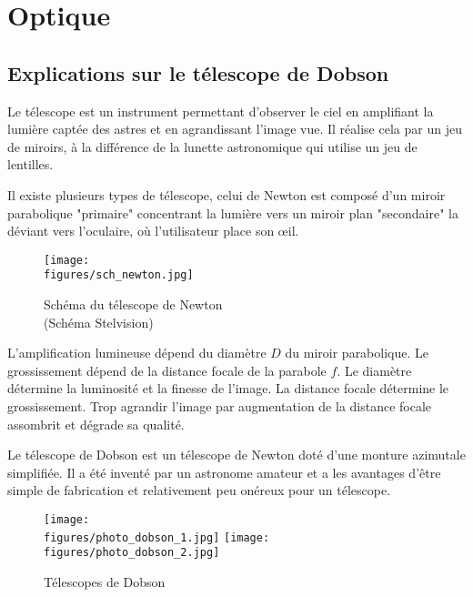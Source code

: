 \chapter{Optique}

\section{Explications sur le télescope de Dobson}

Le télescope est un instrument permettant d'observer le ciel en amplifiant la lumière captée des astres et en agrandissant l'image vue. Il réalise cela par un jeu de miroirs, à la différence de la lunette astronomique qui utilise un jeu de lentilles.

Il existe plusieurs types de télescope, celui de Newton est composé d'un miroir parabolique "primaire" concentrant la lumière vers un miroir plan "secondaire" la déviant vers l'oculaire, où l'utilisateur place son œil.

\begin{figure}[H]
    \centering
    \texttt{[image: \\figures/sch\_newton.jpg]}
    \decoRule
    \caption[
    Schéma du télescope de Newton\\(Schéma \textcopyright Stelvision)]{
    Schéma du télescope de Newton\\(Schéma \textcopyright Stelvision)}
    \label{fig:Schéma du télescope de Newton (Schéma copyright Stelvision)}
    \end{figure}

\vspace{1cm}

L'amplification lumineuse dépend du diamètre $D$ du miroir parabolique. Le grossissement dépend de la distance focale de la parabole $f$. Le diamètre détermine la luminosité et la finesse de l'image. La distance focale détermine le grossissement. Trop agrandir l'image par augmentation de la distance focale assombrit et dégrade sa qualité.

\vspace{1cm}

Le télescope de Dobson est un télescope de Newton doté d'une monture azimutale simplifiée. Il a été inventé par un astronome amateur et a les avantages d'être simple de fabrication et relativement peu onéreux pour un télescope.

\begin{figure}[H]
    \centering
    \texttt{[image: \\figures/photo\_dobson\_1.jpg]}
    \texttt{[image: \\figures/photo\_dobson\_2.jpg]}
    \decoRule
    \caption[
    Télescopes de Dobson]{
    Télescopes de Dobson}
    \label{fig:Télescopes de Dobson}
    \end{figure}

